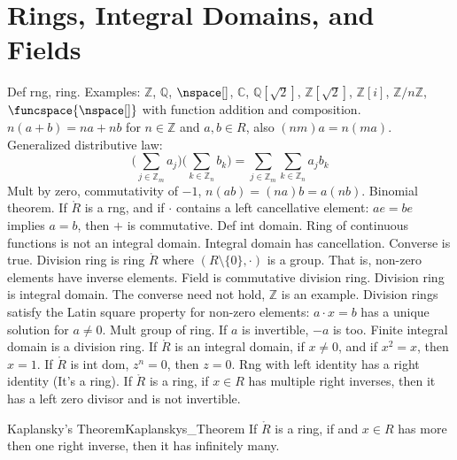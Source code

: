 \documentclass{book}                                                           %
\begin{document}
    \section{Rings, Integral Domains, and Fields}
        Def rng, ring. Examples: $\mathbb{Z}$, $\mathbb{Q}$,
        $\nspace[]$, $\mathbb{C}$, $\mathbb{Q}[\sqrt{2}]$,
        $\mathbb{Z}[\sqrt{2}]$, $\mathbb{Z}[i]$,
        $\mathbb{Z}/n\mathbb{Z}$, $\funcspace{\nspace[]}$ with function
        addition and composition. $n(a+b)=na+nb$ for
        $n\in\mathbb{Z}$ and $a,b\in{R}$, also $(nm)a=n(ma)$.
        Generalized distributive law:
        \begin{equation}
            \Big(\sum_{j\in\mathbb{Z}_{m}}a_{j}\Big)
            \Big(\sum_{k\in\mathbb{Z}_{n}}b_{k}\Big)
            =\sum_{j\in\mathbb{Z}_{m}}\sum_{k\in\mathbb{Z}_{n}}a_{j}b_{k}
        \end{equation}
        Mult by zero, commutativity of $\minus{1}$, $n(ab)=(na)b=a(nb)$.
        Binomial theorem. If $\ring{R}$ is a rng, and if $\cdot$ contains a
        left cancellative element: $ae=be$ implies $a=b$, then $+$ is
        commutative. Def int domain. Ring of continuous functions is not an
        integral domain. Integral domain has cancellation. Converse is true.
        Division ring is ring $\ring{R}$ where $(R\setminus\{0\},\cdot)$ is
        a group. That is, non-zero elements have inverse elements. Field is
        commutative division ring. Division ring is integral domain. The
        converse need not hold, $\mathbb{Z}$ is an example. Division rings
        satisfy the Latin square property for non-zero elements:
        $a\cdot{x}=b$ has a unique solution for $a\ne{0}$. Mult group of
        ring. If $a$ is invertible, $\minus{a}$ is too. Finite integral
        domain is a division ring. If $\ring{R}$ is an integral domain,
        if $x\ne{0}$, and if $x^{2}=x$, then $x=1$. If $\ring{R}$ is int
        dom, $z^{n}=0$, then $z=0$. Rng with left identity has a right
        identity (It's a ring). If $\ring{R}$ is a ring, if $x\in{R}$ has
        multiple right inverses, then it has a left zero divisor and is not
        invertible.
        \begin{ftheorem}{Kaplansky's Theorem}{Kaplanskys_Theorem}
            If $\ring{R}$ is a ring, if and $x\in{R}$ has more then one
            right inverse, then it has infinitely many.
        \end{ftheorem}
\end{document}
